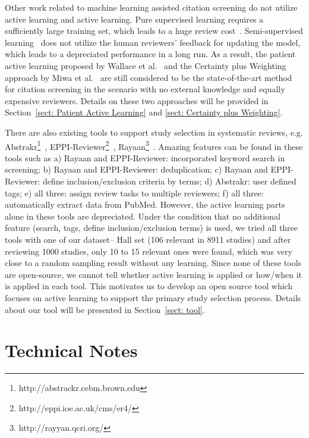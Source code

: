 \documentclass{svjour3}
\theoremstyle{break}
\begin{document}
Other work related to machine learning assisted citation screening do not
utilize active learning and active learning. Pure supervised learning requires a sufficiently large training set, which leads to a huge review cost~\cite{cohen2006reducing,adeva2014automatic}. Semi-supervised learning~\cite{liu2016comparative} does not utilize the human reviewers' feedback for updating the model, which leads to a depreciated performance in a long run. As a result, the patient active
learning proposed by Wallace et al.~\cite{wallace2010semi} and the Certainty plus Weighting approach by Miwa et al.~\cite{miwa2014reducing} are still considered to be the state-of-the-art method for citation screening in the scenario with no external knowledge and equally expensive reviewers. Details on these two approaches will be provided in Section~\ref{sect: Patient Active Learning} and \ref{sect: Certainty plus Weighting}.

There are also existing tools to support study selection in systematic reviews, e.g. Abstrakr\footnote{http://abstrackr.cebm.brown.edu}~\cite{wallace2012deploying}, EPPI-Reviewer\footnote{http://eppi.ioe.ac.uk/cms/er4/}~\cite{thomas2010eppi}, Rayaan\footnote{http://rayyan.qcri.org/}~\cite{Ouzzani2016}. Amazing features can be found in these tools such as a) Rayaan and EPPI-Reviewer: incorporated keyword search in screening; b) Rayaan and EPPI-Reviewer: deduplication; c) Rayaan and EPPI-Reviewer: define inclusion/exclusion criteria by terms; d) Abstrakr: user defined tags; e) all three: assign review tasks to multiple reviewers; f) all three: automatically extract data from PubMed. However, the active learning parts alone in these tools are depreciated. Under the condition that no additional feature (search, tags, define inclusion/exclusion terms) is used, we tried all three tools with one of our dataset-- Hall set (106 relevant in 8911 studies) and after reviewing 1000 studies, only 10 to 15 relevant ones were found, which was very close to a random sampling result without any learning. Since none of these tools are open-source, we cannot tell whether active learning is applied or how/when it is applied in each tool. This motivates us to develop an open source tool which focuses on active learning to support the primary study selection process. Details about our tool will be presented in Section~\ref{sect: tool}.



\section{Technical Notes}
\label{sect: Technical Briefing}
\end{document}
